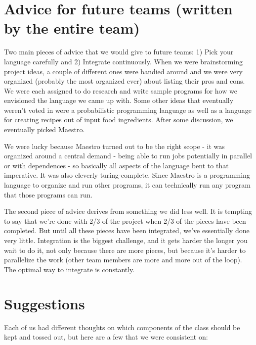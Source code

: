 \section{Advice for future teams (written by the entire team)}
Two main pieces of advice that we would give to future teams: 1) Pick your language carefully and 2) Integrate continuously. When we were brainstorming project ideas, a couple of different ones were bandied around and we were very organized (probably the most organized ever) about listing their pros and cons. We were each assigned to do research and write sample programs for how we envisioned the language we came up with. Some other ideas that eventually weren't voted in were a probabilistic programming language as well as a language for creating recipes out of input food ingredients. After some discussion, we eventually picked Maestro.

We were lucky because Maestro turned out to be the right scope - it was organized around a central demand - being able to run jobs potentially in parallel or with dependences - so basically all aspects of the language bent to that imperative. It was also cleverly turing-complete. Since Maestro is a programming language to organize and run other programs, it can technically run any program that those programs can run.

The second piece of advice derives from something we did less well. It is tempting to say that we're done with 2/3 of the project when 2/3 of the pieces have been completed. But until all these pieces have been integrated, we've essentially done very little. Integration is the biggest challenge, and it gets harder the longer you wait to do it, not only because there are more pieces, but because it's harder to parallelize the work (other team members are more and more out of the loop). The optimal way to integrate is constantly. 
    
\section{Suggestions}
Each of us had different thoughts on which components of the class should be kept and tossed out, but here are a few that we were consistent on:

